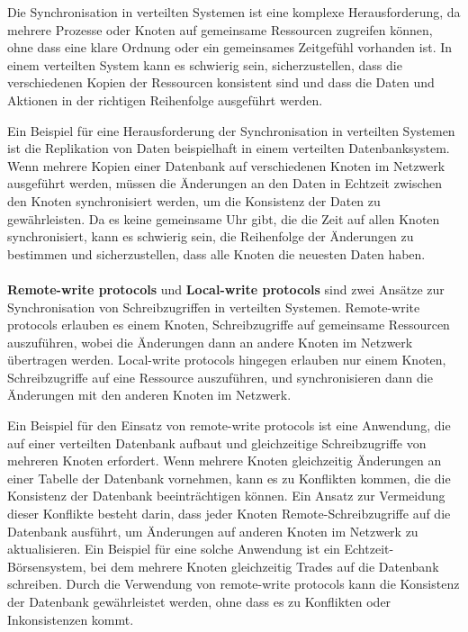 \documentclass[../vs-script-first-v01.tex]{subfiles}
\begin{document}
Die Synchronisation in verteilten Systemen ist eine komplexe Herausforderung, da mehrere Prozesse oder Knoten auf gemeinsame Ressourcen zugreifen können, ohne dass eine klare Ordnung oder ein gemeinsames Zeitgefühl vorhanden ist. In einem verteilten System kann es schwierig sein, sicherzustellen, dass die verschiedenen Kopien der Ressourcen konsistent sind und dass die Daten und Aktionen in der richtigen Reihenfolge ausgeführt werden.

Ein Beispiel für eine Herausforderung der Synchronisation in verteilten Systemen ist die Replikation von Daten beispielhaft in einem verteilten Datenbanksystem. Wenn mehrere Kopien einer Datenbank auf verschiedenen Knoten im Netzwerk ausgeführt werden, müssen die Änderungen an den Daten in Echtzeit zwischen den Knoten synchronisiert werden, um die Konsistenz der Daten zu gewährleisten. Da es keine gemeinsame Uhr gibt, die die Zeit auf allen Knoten synchronisiert, kann es schwierig sein, die Reihenfolge der Änderungen zu bestimmen und sicherzustellen, dass alle Knoten die neuesten Daten haben.
\\\\
\textbf{Remote-write protocols} und \textbf{Local-write protocols} sind zwei Ansätze zur Synchronisation von Schreibzugriffen in verteilten Systemen. Remote-write protocols erlauben es einem Knoten, Schreibzugriffe auf gemeinsame Ressourcen auszuführen, wobei die Änderungen dann an andere Knoten im Netzwerk übertragen werden. Local-write protocols hingegen erlauben nur einem Knoten, Schreibzugriffe auf eine Ressource auszuführen, und synchronisieren dann die Änderungen mit den anderen Knoten im Netzwerk.

Ein Beispiel für den Einsatz von remote-write protocols ist eine Anwendung, die auf einer verteilten Datenbank aufbaut und gleichzeitige Schreibzugriffe von mehreren Knoten erfordert. Wenn mehrere Knoten gleichzeitig Änderungen an einer Tabelle der Datenbank vornehmen, kann es zu Konflikten kommen, die die Konsistenz der Datenbank beeinträchtigen können. Ein Ansatz zur Vermeidung dieser Konflikte besteht darin, dass jeder Knoten Remote-Schreibzugriffe auf die Datenbank ausführt, um Änderungen auf anderen Knoten im Netzwerk zu aktualisieren. Ein Beispiel für eine solche Anwendung ist ein Echtzeit-Börsensystem, bei dem mehrere Knoten gleichzeitig Trades auf die Datenbank schreiben. Durch die Verwendung von remote-write protocols kann die Konsistenz der Datenbank gewährleistet werden, ohne dass es zu Konflikten oder Inkonsistenzen kommt.
\end{document}
